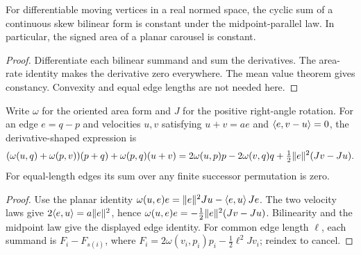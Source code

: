 \begin{proposition}
\label{prop:area}
\leanok
{}
For differentiable moving vertices in a real normed space, the cyclic sum
of a continuous skew bilinear form is constant under the midpoint-parallel
law. In particular, the signed area of a planar carousel is constant.
\end{proposition}
\begin{proof}
\leanok
Differentiate each bilinear summand and sum the derivatives. The area-rate
identity makes the derivative zero everywhere. The mean value theorem
gives constancy. Convexity and equal edge lengths are not needed here.
\end{proof}

\begin{lemma}
\label{lem:moment-rate}
\leanok
{}
Write $\omega$ for the oriented area form and $J$ for the positive
right-angle rotation. For an edge $e=q-p$ and velocities $u,v$ satisfying
$u+v=ae$ and $\langle e,v-u\rangle=0$, the derivative-shaped expression is
\[
 (\omega(u,q)+\omega(p,v))(p+q)+\omega(p,q)(u+v)
 =2\omega(u,p)p-2\omega(v,q)q
   +\tfrac12\lVert e\rVert^2(Jv-Ju).
\]
For equal-length edges its sum over any finite successor permutation is zero.
\end{lemma}
\begin{proof}
\leanok
Use the planar identity
$\omega(u,e)e=\lVert e\rVert^2 Ju-\langle e,u\rangle\,Je$.
The two velocity laws give $2\langle e,u\rangle=a\lVert e\rVert^2$, hence
$\omega(u,e)e=-\tfrac12\lVert e\rVert^2(Jv-Ju)$.
Bilinearity and the midpoint law give the displayed edge identity.
For common edge length $\ell$, each summand is $F_i-F_{s(i)}$, where
$F_i=2\omega(v_i,p_i)p_i-\tfrac12\ell^2Jv_i$; reindex to cancel.
\end{proof}

